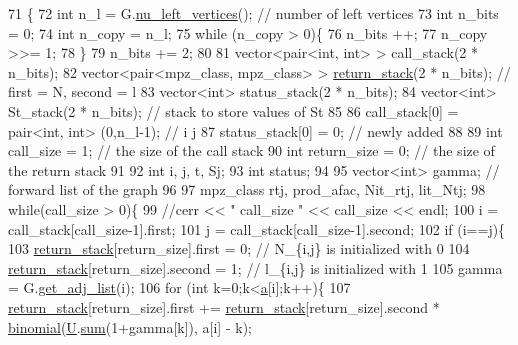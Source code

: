 \begin{DoxyCode}
71                                                                          \{
72   \textcolor{keywordtype}{int} n\_l = G.\hyperlink{classb__graph_a5e71d5c97f2501b0b93c17146cf7e68e}{nu\_left\_vertices}(); \textcolor{comment}{// number of left vertices}
73   \textcolor{keywordtype}{int} n\_bits = 0;
74   \textcolor{keywordtype}{int} n\_copy = n\_l;
75   \textcolor{keywordflow}{while} (n\_copy > 0)\{
76     n\_bits ++;
77     n\_copy >>= 1;
78   \}
79   n\_bits += 2;
80 
81   vector<pair<int, int> > call\_stack(2 * n\_bits);
82   vector<pair<mpz\_class, mpz\_class> > \hyperlink{namespacehelper__vars_a6d2100c373830cacd232319a9958652d}{return\_stack}(2 * n\_bits); \textcolor{comment}{// first = N, second = l}
83   vector<int> status\_stack(2 * n\_bits);
84   vector<int> St\_stack(2 * n\_bits); \textcolor{comment}{// stack to store values of St}
85  
86   call\_stack[0] = pair<int, int> (0,n\_l-1); \textcolor{comment}{// i j }
87   status\_stack[0] = 0; \textcolor{comment}{// newly added}
88  
89   \textcolor{keywordtype}{int} call\_size = 1; \textcolor{comment}{// the size of the call stack}
90   \textcolor{keywordtype}{int} return\_size = 0; \textcolor{comment}{// the size of the return stack}
91 
92   \textcolor{keywordtype}{int} i, j, t, Sj;
93   \textcolor{keywordtype}{int} status;
94  
95   vector<int> gamma; \textcolor{comment}{// forward list  of the graph}
96 
97   mpz\_class rtj, prod\_afac, Nit\_rtj, lit\_Ntj;
98   \textcolor{keywordflow}{while}(call\_size > 0)\{
99     \textcolor{comment}{//cerr << " call\_size " << call\_size << endl;}
100     i = call\_stack[call\_size-1].first;
101     j = call\_stack[call\_size-1].second;
102     \textcolor{keywordflow}{if} (i==j)\{
103       \hyperlink{namespacehelper__vars_a6d2100c373830cacd232319a9958652d}{return\_stack}[return\_size].first = 0; \textcolor{comment}{// N\_\{i,j\} is initialized with 0}
104       \hyperlink{namespacehelper__vars_a6d2100c373830cacd232319a9958652d}{return\_stack}[return\_size].second = 1; \textcolor{comment}{// l\_\{i,j\} is initialized with 1}
105       gamma = G.\hyperlink{classb__graph_aa81c7179b9c6cb4986c4b41e84a85799}{get\_adj\_list}(i);
106       \textcolor{keywordflow}{for} (\textcolor{keywordtype}{int} k=0;k<\hyperlink{classb__graph__encoder_afd22d167f495cd85b41397f337c377c2}{a}[i];k++)\{
107         \hyperlink{namespacehelper__vars_a6d2100c373830cacd232319a9958652d}{return\_stack}[return\_size].first += \hyperlink{namespacehelper__vars_a6d2100c373830cacd232319a9958652d}{return\_stack}[return\_size].second * 
      \hyperlink{compression__helper_8cpp_acecca9cb279d3b3d82915a07d67818cf}{binomial}(\hyperlink{classb__graph__encoder_ac810138443002a2b2cf579ced2dc34ce}{U}.\hyperlink{classreverse__fenwick__tree_a672731fd6395b4853430073a099a80e6}{sum}(1+gamma[k]), a[i] - k);

\end{DoxyCode}
